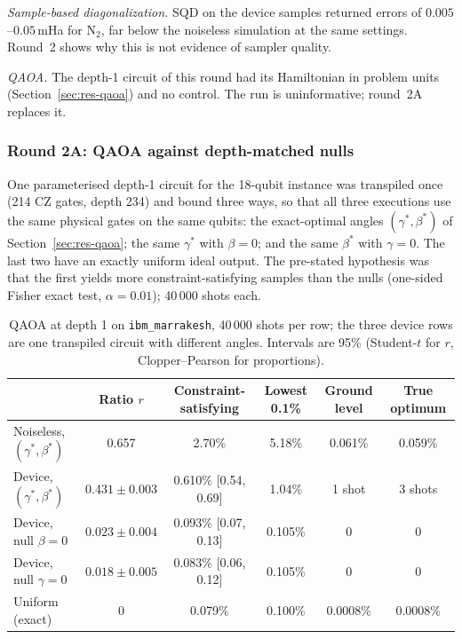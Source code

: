 \documentclass[11pt,a4paper]{article}
\begin{document}
\emph{Sample-based diagonalization.} SQD on the device samples returned
errors of $0.005$--$0.05$\,mHa for N$_2$, far below the noiseless simulation
at the same settings. Round~2 shows why this is not evidence of sampler
quality.

\emph{QAOA.} The depth-1 circuit of this round had its Hamiltonian in
problem units (Section~\ref{sec:res-qaoa}) and no control. The run is
uninformative; round~2A replaces it.

\subsubsection{Round 2A: QAOA against depth-matched nulls}

One parameterised depth-1 circuit for the 18-qubit instance was transpiled
once (214 CZ gates, depth 234) and bound three ways, so that all three
executions use the same physical gates on the same qubits: the exact-optimal
angles $(\gamma^\ast, \beta^\ast)$ of Section~\ref{sec:res-qaoa}; the same
$\gamma^\ast$ with $\beta = 0$; and the same $\beta^\ast$ with $\gamma = 0$.
The last two have an exactly uniform ideal output. The pre-stated hypothesis
was that the first yields more constraint-satisfying samples than the nulls
(one-sided Fisher exact test, $\alpha = 0.01$); 40\,000 shots each.

\begin{table}[H]
\centering\footnotesize\setlength{\tabcolsep}{5pt}
\begin{tabular}{lccccc}
\toprule
 & Ratio $r$ & Constraint-satisfying & Lowest 0.1\% & Ground level & True optimum \\
\midrule
Noiseless, $(\gamma^\ast,\beta^\ast)$ & 0.657 & 2.70\% & 5.18\% & 0.061\% & 0.059\% \\
Device, $(\gamma^\ast,\beta^\ast)$ & $0.431 \pm 0.003$ & 0.610\% [0.54, 0.69] & 1.04\% & 1 shot & 3 shots \\
Device, null $\beta = 0$ & $0.023 \pm 0.004$ & 0.093\% [0.07, 0.13] & 0.105\% & 0 & 0 \\
Device, null $\gamma = 0$ & $0.018 \pm 0.005$ & 0.083\% [0.06, 0.12] & 0.105\% & 0 & 0 \\
Uniform (exact) & 0 & 0.079\% & 0.100\% & 0.0008\% & 0.0008\% \\
\bottomrule
\end{tabular}
\caption{QAOA at depth 1 on \texttt{ibm\_marrakesh}, 40\,000 shots per row;
the three device rows are one transpiled circuit with different angles.
Intervals are 95\% (Student-$t$ for $r$, Clopper--Pearson for proportions).}
\label{tab:hw-qaoa}
\end{table}
\end{document}
